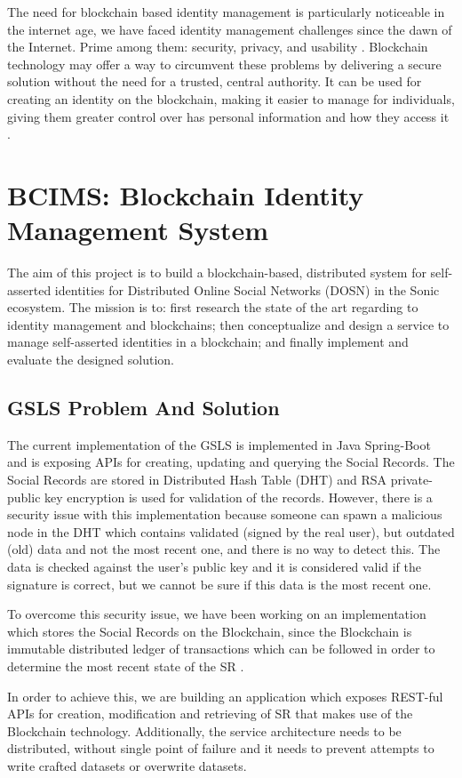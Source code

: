 The need for blockchain based identity management is particularly noticeable in the internet age, we have faced identity management challenges since the dawn of the Internet. Prime among them: security, privacy, and usability \cite{Blockchain}.
Blockchain technology may offer a way to circumvent these problems by delivering a secure solution without the need for a trusted, central authority. It can be used for creating an identity on the blockchain, making it easier to manage for individuals, giving them greater control over has personal information and how they access it \cite{Blockchain}.

\section{BCIMS: Blockchain Identity Management System}
The aim of this project is to build a blockchain-based, distributed system for self-asserted identities for Distributed Online Social Networks (DOSN) in the Sonic ecosystem. The mission is to:  first research the state of the art regarding to identity management and blockchains; then conceptualize and design a service to manage self-asserted identities in a blockchain; and finally implement and evaluate the designed solution.

\subsection{GSLS Problem And Solution}
The current implementation of the GSLS is implemented in Java Spring-Boot and is exposing APIs for creating, updating and  querying the Social Records. The Social Records are stored in  Distributed Hash Table (DHT) and RSA private-public key encryption is used for validation of the records. However, there is a security issue with this implementation because someone can spawn a malicious node in the DHT which contains validated (signed by the real user), but outdated (old) data and not the most recent one, and there is no way to detect this. The data is checked against the user’s public key and it is considered valid if the signature is correct, but we cannot be sure if this data is the most recent one.

To overcome this security issue, we have been working on an implementation which stores the Social Records on the Blockchain, since the Blockchain is immutable distributed ledger of transactions which can be followed in order to determine the most recent state of the SR \cite{gondor2016distributed}.

In order to achieve this, we are building an application which exposes REST-ful APIs for creation, modification and retrieving of SR that makes use of the Blockchain technology. Additionally, the service architecture needs to be distributed, without single point of failure and it needs to prevent attempts to write crafted datasets or overwrite datasets.

